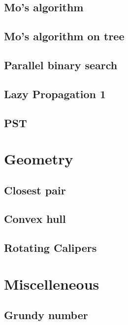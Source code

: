\documentclass[10pt,landscape,a4paper,twocolumn]{article}
\begin{document}
\subsection{Mo's algorithm}


\subsection{Mo's algorithm on tree}


\subsection{Parallel binary search}


\subsection{Lazy Propagation 1}


\subsection{PST}


\section{Geometry}
\subsection{Closest pair}


\subsection{Convex hull}


\subsection{Rotating Calipers}



\section{Miscelleneous}
\subsection{Grundy number}

\end{document}
